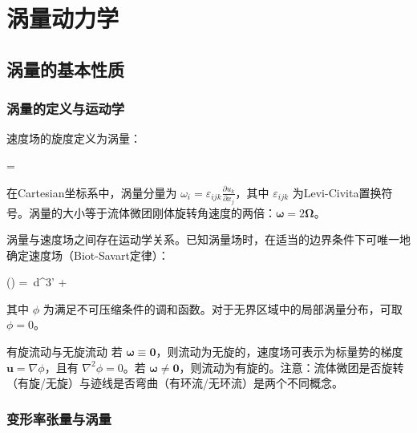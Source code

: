 \chapter{涡量动力学}


\section{涡量的基本性质}

\subsection{涡量的定义与运动学}

速度场的旋度定义为涡量：

\begin{myformula}
    \boldsymbol{\omega} = \nabla\times{}
\end{myformula}

在Cartesian坐标系中，涡量分量为 $\omega_i = \varepsilon_{ijk}\frac{\partial u_k}{\partial x_j}$，其中 $\varepsilon_{ijk}$ 为Levi-Civita置换符号。涡量的大小等于流体微团刚体旋转角速度的两倍：$\boldsymbol{\omega} = 2\boldsymbol{\Omega}$。

涡量与速度场之间存在运动学关系。已知涡量场时，在适当的边界条件下可唯一地确定速度场（Biot-Savart定律）：

\begin{myformula}
    () = \int {}\,d^{3}' + \nabla\phi
\end{myformula}

其中 $\phi$ 为满足不可压缩条件的调和函数。对于无界区域中的局部涡量分布，可取 $\phi=0$。

\begin{mydefinition}{有旋流动与无旋流动}
若 $\boldsymbol{\omega} \equiv \mathbf{0}$，则流动为无旋的，速度场可表示为标量势的梯度 $\mathbf{u}=\nabla\phi$，且有 $\nabla^{2}\phi = 0$。若 $\boldsymbol{\omega}\neq\mathbf{0}$，则流动为有旋的。注意：流体微团是否旋转（有旋/无旋）与迹线是否弯曲（有环流/无环流）是两个不同概念。
\end{mydefinition}

\subsection{变形率张量与涡量}

